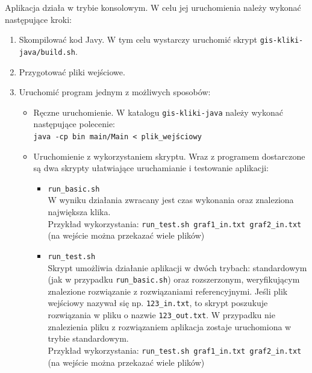 \documentclass[12pt, a4paper]{article}
\begin{document}
\begin{appendices}
Aplikacja działa w trybie konsolowym. W celu jej uruchomienia należy wykonać następujące kroki:
\begin{enumerate}
 \item Skompilować kod Javy. W tym celu wystarczy uruchomić skrypt \texttt{gis-kliki-java/build.sh}.
 \item Przygotować pliki wejściowe.
 \item Uruchomić program jednym z możliwych sposobów:
 \begin{itemize}
 	\item Ręczne uruchomienie. W katalogu \texttt{gis-kliki-java} należy wykonać następujące polecenie: \\
 	\texttt{java -cp bin main/Main < plik\_wejściowy}
 	\item Uruchomienie z wykorzystaniem skryptu.
 	Wraz z programem dostarczone są dwa skrypty ułatwiające uruchamianie i testowanie aplikacji:
 	\begin{itemize}
 		\item \texttt{run\_basic.sh} \\
 		W wyniku działania zwracany jest czas wykonania oraz znaleziona największa klika.\\
 		Przykład wykorzystania:
 		\texttt{run\_test.sh graf1\_in.txt graf2\_in.txt} (na wejście można przekazać wiele plików)
 		\item \texttt{run\_test.sh} \\
 		Skrypt umożliwia działanie aplikacji w dwóch trybach: standardowym (jak w przypadku \texttt{run\_basic.sh}) 
oraz rozszerzonym, weryfikującym znalezione rozwiązanie z rozwiązaniami referencyjnymi. 
Jeśli plik wejściowy nazywał się np. \texttt{123\_in.txt}, to skrypt poszukuje rozwiązania w pliku o nazwie \texttt{123\_out.txt}. 
W przypadku nie znalezienia pliku z rozwiązaniem aplikacja zostaje uruchomiona w trybie standardowym. \\
 		Przykład wykorzystania:
 		\texttt{run\_test.sh graf1\_in.txt graf2\_in.txt} (na wejście można przekazać wiele plików)
 	\end{itemize}
 \end{itemize}
\end{enumerate}

\end{appendices}



\end{document}
